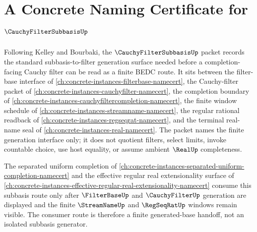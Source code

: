 \chapter{A Concrete Naming Certificate for $\CauchyFilterSubbasisUp$}
\label{ch:concrete-instances-cauchy-filter-subbasis-namecert}

Following Kelley and Bourbaki, the $\CauchyFilterSubbasisUp$ packet records the standard subbasis-to-filter generation surface needed before a completion-facing Cauchy filter can be read as a finite BEDC route. It sits between the filter-base interface of \autoref{ch:concrete-instances-filterbase-namecert}, the Cauchy-filter packet of \autoref{ch:concrete-instances-cauchyfilter-namecert}, the completion boundary of \autoref{ch:concrete-instances-cauchyfiltercompletion-namecert}, the finite window schedule of \autoref{ch:concrete-instances-streamname-namecert}, the regular rational readback of \autoref{ch:concrete-instances-regseqrat-namecert}, and the terminal real-name seal of \autoref{ch:concrete-instances-real-namecert}. The packet names the finite generation interface only; it does not quotient filters, select limits, invoke countable choice, use host equality, or assume ambient $\RealUp$ completeness.

The separated uniform completion of \autoref{ch:concrete-instances-separated-uniform-completion-namecert} and the effective regular real extensionality surface of \autoref{ch:concrete-instances-effective-regular-real-extensionality-namecert} consume this subbasis route only after $\FilterBaseUp$ and $\CauchyFilterUp$ generation are displayed and the finite $\StreamNameUp$ and $\RegSeqRatUp$ windows remain visible. The consumer route is therefore a finite generated-base handoff, not an isolated subbasis generator.

